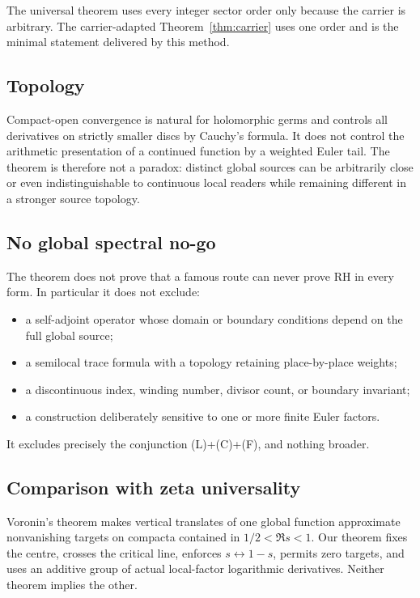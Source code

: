 \documentclass[11pt]{article}
\begin{document}
The universal theorem uses every integer sector order only because the carrier is
arbitrary.  The carrier-adapted Theorem~\ref{thm:carrier} uses one order and is the
minimal statement delivered by this method.

\subsection{Topology}

Compact-open convergence is natural for holomorphic germs and controls all
derivatives on strictly smaller discs by Cauchy's formula.  It does not control the
arithmetic presentation of a continued function by a weighted Euler tail.  The
theorem is therefore not a paradox: distinct global sources can be arbitrarily close
or even indistinguishable to continuous local readers while remaining different in
a stronger source topology.

\subsection{No global spectral no-go}

The theorem does not prove that a famous route can never prove RH in every form.
In particular it does not exclude:
\begin{itemize}
\item a self-adjoint operator whose domain or boundary conditions depend on the full
global source;
\item a semilocal trace formula with a topology retaining place-by-place weights;
\item a discontinuous index, winding number, divisor count, or boundary invariant;
\item a construction deliberately sensitive to one or more finite Euler factors.
\end{itemize}
It excludes precisely the conjunction (L)+(C)+(F), and nothing broader.

\subsection{Comparison with zeta universality}

Voronin's theorem makes vertical translates of one global function approximate
nonvanishing targets on compacta contained in \(1/2<\Re s<1\).  Our theorem fixes the
centre, crosses the critical line, enforces \(s\leftrightarrow1-s\), permits zero
targets, and uses an additive group of actual local-factor logarithmic derivatives.
Neither theorem implies the other.
\end{document}
